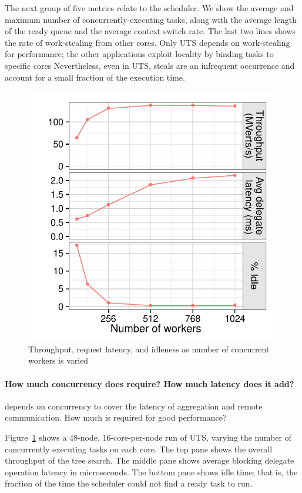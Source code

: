 The next group of five metrics relate to the scheduler. We show the
average and maximum number of concurrently-executing tasks, along with
the average length of the ready queue and the average context switch
rate.  The last two lines shows the rate of work-stealing from
other cores. Only UTS depends on work-stealing for performance; the
other applications exploit locality by binding tasks to specific cores
Nevertheless, even in UTS, steals are an infrequent occurrence and account for a
small fraction of the execution time.



\begin{figure}[ht]
    \begin{center}
      \includegraphics[height=0.4\textwidth]{results/plot_concurrency.pdf}
    \end{center}
    \vspace*{-0.25in}
    \caption{Throughput, request latency, and idleness as number of concurrent workers is varied}
    \label{fig:grappa-concurrency}
\end{figure}

\paragraph{How much concurrency does \Grappa require? How much latency does it add?}
\Grappa depends on concurrency to cover the latency of aggregation and
remote communication. How much is required for good performance?

Figure~\ref{fig:grappa-concurrency} shows a 48-node, 16-core-per-node
run of UTS, varying the number of concurrently executing tasks on each
core. The top pane shows the overall throughput of the tree search.
The middle pane shows average blocking delegate operation latency in
microseconds. The bottom pane shows idle time; that is, the fraction
of the time the scheduler could not find a ready task to run.

